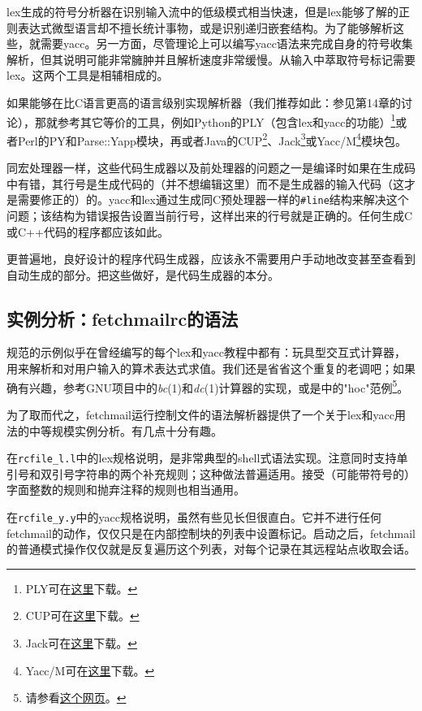 \documentclass[12pt,oneside]{book}
\begin{document}
\begin{common-format}
lex生成的符号分析器在识别输入流中的低级模式相当快速，但是lex能够了解的正则表达式微型语言却不擅长统计事物，或是识别递归嵌套结构。为了能够解析这些，就需要yacc。另一方面，尽管理论上可以编写yacc语法来完成自身的符号收集解析，但其说明可能非常臃肿并且解析速度非常缓慢。从输入中萃取符号标记需要lex。这两个工具是相辅相成的。

如果能够在比C语言更高的语言级别实现解析器（我们推荐如此：参见第14章的讨论），那就参考其它等价的工具，例如Python的PLY（包含lex和yacc的功能）\footnote{PLY可在\href{http://systems.cs.uchicago.edu/ply/}{这里}下载。}或者Perl的PY和Parse::Yapp模块，再或者Java的CUP\footnote{CUP可在\href{http://www.cs.princeton.edu/~appel/modern/java/CUP/}{这里}下载。}、Jack\footnote{Jack可在\href{http://www.javaworld.com/javaworld/jw-12-1996/jw-12-jack.html}{这里}下载。}或Yacc/M\footnote{Yacc/M可在\href{http://david.tribble.com/yaccm.html}{这里}下载。}模块包。

同宏处理器一样，这些代码生成器以及前处理器的问题之一是编译时如果在生成码中有错，其行号是生成代码的（并不想编辑这里）而不是生成器的输入代码（这才是需要修正的）的。yacc和lex通过生成同C预处理器一样的\verb+#line+结构来解决这个问题；该结构为错误报告设置当前行号，这样出来的行号就是正确的。任何生成C或C++代码的程序都应该如此。

更普遍地，良好设计的程序代码生成器，应该永不需要用户手动地改变甚至查看到自动生成的部分。把这些做好，是代码生成器的本分。

\subsection{实例分析：fetchmailrc的语法}
规范的示例似乎在曾经编写的每个lex和yacc教程中都有：玩具型交互式计算器，用来解析和对用户输入的算术表达式求值。我们还是省省这个重复的老调吧；如果确有兴趣，参考GNU项目中的\textit{bc}(1)和\textit{dc}(1)计算器的实现，或是\cite{Kernighan-Pike84}中的"hoc"范例\footnote{请参看\href{http://cm.bell-labs.com/cm/cs/upe/}{这个网页}。}。

为了取而代之，fetchmail运行控制文件的语法解析器提供了一个关于lex和yacc用法的中等规模实例分析。有几点十分有趣。

在\verb+rcfile_l.l+中的lex规格说明，是非常典型的shell式语法实现。注意同时支持单引号和双引号字符串的两个补充规则；这种做法普遍适用。接受（可能带符号的）字面整数的规则和抛弃注释的规则也相当通用。

在\verb+rcfile_y.y+中的yacc规格说明，虽然有些见长但很直白。它并不进行任何fetchmail的动作，仅仅只是在内部控制块的列表中设置标记。启动之后，fetchmail的普通模式操作仅仅就是反复遍历这个列表，对每个记录在其远程站点收取会话。


\end{common-format}
\end{document}
